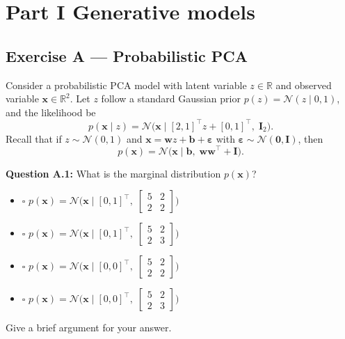 \documentclass[12pt,a4paper]{article}
\newcommand{\N}{\mathcal{N}}
\begin{document}
\section*{Part I \quad Generative models}

\subsection*{Exercise A --- Probabilistic PCA}

Consider a probabilistic PCA model with latent variable $z\in\mathbb{R}$ and observed variable
$\mathbf{x}\in\mathbb{R}^2$.  Let $z$ follow a standard Gaussian prior $p(z)=\N(z\mid 0,1)$, and
the likelihood be
\[
  p(\mathbf{x}\mid z) = \N\!\bigl(\mathbf{x}\mid [2,1]^\top z + [0,1]^\top,\; \mathbf{I}_2\bigr).
\]
Recall that if $z\sim\N(0,1)$ and $\mathbf{x}=\mathbf{w}z+\mathbf{b}+\boldsymbol{\varepsilon}$ with
$\boldsymbol{\varepsilon}\sim\N(\mathbf{0},\mathbf{I})$, then
\[
  p(\mathbf{x}) = \N\!\bigl(\mathbf{x}\mid \mathbf{b},\;\mathbf{w}\mathbf{w}^\top+\mathbf{I}\bigr). \tag{1}
\]

\textbf{Question A.1:} What is the marginal distribution $p(\mathbf{x})$?

\begin{itemize}[noitemsep,label={}]
  \item[\textbf{A}] $\square$ \quad $p(\mathbf{x}) = \N\!\bigl(\mathbf{x}\mid [0,1]^\top,\; \begin{bmatrix}5&2\\2&2\end{bmatrix}\bigr)$
  \item[\textbf{B}] $\square$ \quad $p(\mathbf{x}) = \N\!\bigl(\mathbf{x}\mid [0,1]^\top,\; \begin{bmatrix}5&2\\2&3\end{bmatrix}\bigr)$
  \item[\textbf{C}] $\square$ \quad $p(\mathbf{x}) = \N\!\bigl(\mathbf{x}\mid [0,0]^\top,\; \begin{bmatrix}5&2\\2&2\end{bmatrix}\bigr)$
  \item[\textbf{D}] $\square$ \quad $p(\mathbf{x}) = \N\!\bigl(\mathbf{x}\mid [0,0]^\top,\; \begin{bmatrix}5&2\\2&3\end{bmatrix}\bigr)$
\end{itemize}

Give a brief argument for your answer.
\end{document}
